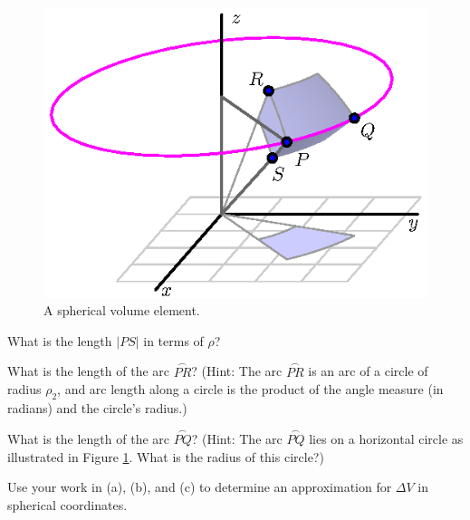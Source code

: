 \begin{activity}
\begin{figure}[ht]
\begin{center}
\begin{minipage}{2.5in}
\begin{center}
  \includegraphics{figures/fig_11_8_spherical_volume.eps}
\end{center}
\caption{A spherical volume element.}
\label{F:11.8.Spherical_Vol_Element_b}
\end{minipage}
\end{center}
\end{figure}
    \ba
        \item What is the length $|PS|$ in terms of $\rho$? 

    \item What is the length of the arc $\overset{\frown}{PR}$? (Hint: The arc $\overset{\frown}{PR}$ is an arc of a circle of radius $\rho_2$, and arc length along a circle is the product of the angle measure (in radians) and the circle's radius.)


    \item What is the length of the arc $\overset{\frown}{PQ}$? (Hint: The arc $\overset{\frown}{PQ}$ lies on a horizontal circle as illustrated in Figure \ref{F:11.8.Spherical_Vol_Element_b}. What is the radius of this circle?)


    \item Use your work in (a), (b), and (c) to determine an approximation for $\Delta V$ in spherical coordinates.


    \ea

\end{activity}
